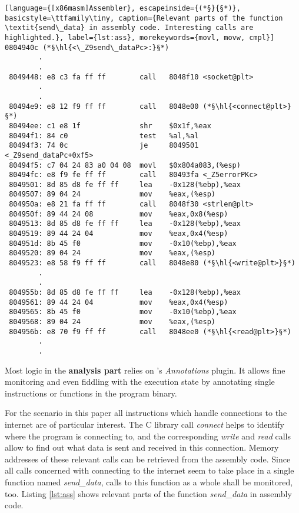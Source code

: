 \bigskip
\begin{lstlisting}[language={[x86masm]Assembler}, escapeinside={(*§}{§*)}, basicstyle=\ttfamily\tiny, caption={Relevant parts of the function \textit{send\_data} in assembly code. Interesting calls are highlighted.}, label={lst:ass}, morekeywords={movl, movw, cmpl}]
0804940c (*§\hl{<\_Z9send\_dataPc>:}§*)
 		.
 		.
 8049448: e8 c3 fa ff ff       	call   8048f10 <socket@plt>
		.
		.
 80494e9: e8 12 f9 ff ff       	call   8048e00 (*§\hl{<connect@plt>}§*)
 80494ee: c1 e8 1f             	shr    $0x1f,%eax
 80494f1: 84 c0                	test   %al,%al
 80494f3: 74 0c                	je     8049501						<_Z9send_dataPc+0xf5>
 80494f5: c7 04 24 83 a0 04 08 	movl   $0x804a083,(%esp)
 80494fc: e8 f9 fe ff ff       	call   80493fa <_Z5errorPKc>
 8049501: 8d 85 d8 fe ff ff    	lea    -0x128(%ebp),%eax
 8049507: 89 04 24             	mov    %eax,(%esp)
 804950a: e8 21 fa ff ff       	call   8048f30 <strlen@plt>
 804950f: 89 44 24 08          	mov    %eax,0x8(%esp)
 8049513: 8d 85 d8 fe ff ff    	lea    -0x128(%ebp),%eax
 8049519: 89 44 24 04          	mov    %eax,0x4(%esp)
 804951d: 8b 45 f0             	mov    -0x10(%ebp),%eax
 8049520: 89 04 24             	mov    %eax,(%esp)
 8049523: e8 58 f9 ff ff       	call   8048e80 (*§\hl{<write@plt>}§*)
		.
		.
 804955b: 8d 85 d8 fe ff ff    	lea    -0x128(%ebp),%eax
 8049561: 89 44 24 04          	mov    %eax,0x4(%esp)
 8049565: 8b 45 f0             	mov    -0x10(%ebp),%eax
 8049568: 89 04 24             	mov    %eax,(%esp)
 804956b: e8 70 f9 ff ff       	call   8048ee0 (*§\hl{<read@plt>}§*)
		.
		.
\end{lstlisting}
\bigskip

Most logic in the \textbf{analysis part} relies on \sse's \textit{Annotations} plugin.
It allows fine monitoring and even fiddling with the execution state by annotating single instructions or functions in the program binary.

For the scenario in this paper all instructions which handle connections to the internet are of particular interest.
The C library call \textit{connect} helps to identify where the program is connecting to, and the corresponding \textit{write} and \textit{read} calls allow to find out what data is sent and received in this connection.
Memory addresses of these relevant calls can be retrieved from the assembly code.
Since all calls concerned with connecting to the internet seem to take place in a single function named \textit{send\_data}, calls to this function as a whole shall be monitored, too.
Listing \ref{lst:ass} shows relevant parts of the function \textit{send\_data} in assembly code.

